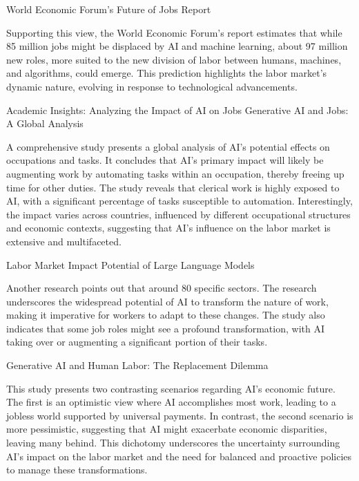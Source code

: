 \documentclass[11pt]{article}
\begin{document}
World Economic Forum’s Future of Jobs Report

Supporting this view, the World Economic Forum’s report estimates that while 85 million jobs might be displaced by AI and machine learning, about 97 million new roles, more suited to the new division of labor between humans, machines, and algorithms, could emerge. This prediction highlights the labor market's dynamic nature, evolving in response to technological advancements.

Academic Insights: Analyzing the Impact of AI on Jobs
Generative AI and Jobs: A Global Analysis

A comprehensive study presents a global analysis of AI’s potential effects on occupations and tasks. It concludes that AI's primary impact will likely be augmenting work by automating tasks within an occupation, thereby freeing up time for other duties. The study reveals that clerical work is highly exposed to AI, with a significant percentage of tasks susceptible to automation. Interestingly, the impact varies across countries, influenced by different occupational structures and economic contexts, suggesting that AI's influence on the labor market is extensive and multifaceted.

Labor Market Impact Potential of Large Language Models

Another research points out that around 80%
specific sectors. The research underscores the widespread potential of AI to transform the nature of work, making it imperative for workers to adapt to these changes. The study also indicates that some job roles might see a profound transformation, with AI taking over or augmenting a significant portion of their tasks.

Generative AI and Human Labor: The Replacement Dilemma

This study presents two contrasting scenarios regarding AI's economic future. The first is an optimistic view where AI accomplishes most work, leading to a jobless world supported by universal payments. In contrast, the second scenario is more pessimistic, suggesting that AI might exacerbate economic disparities, leaving many behind. This dichotomy underscores the uncertainty surrounding AI's impact on the labor market and the need for balanced and proactive policies to manage these transformations.
\end{document}
